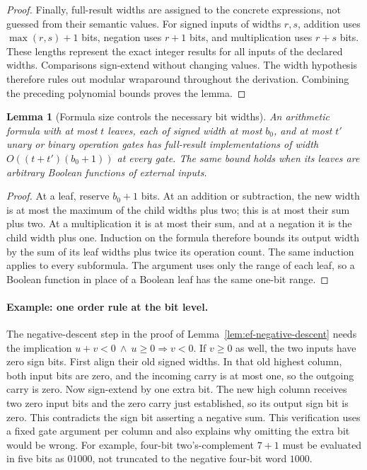 \documentclass[11pt]{article}
\newtheorem{lemma}[theorem]{Lemma}
\theoremstyle{definition}
\theoremstyle{remark}
\begin{document}
\begin{proof}
Finally, full-result widths are assigned to the concrete expressions,
not guessed from their semantic values. For signed inputs of widths
$r,s$, addition uses $\max(r,s)+1$ bits, negation uses $r+1$
bits, and multiplication uses $r+s$ bits. These lengths represent
the exact integer results for all inputs of the declared widths.
Comparisons sign-extend without changing values. The width hypothesis
therefore rules out modular wraparound throughout the derivation.
Combining the preceding polynomial bounds proves the lemma.
\end{proof}

\begin{lemma}[Formula size controls the necessary bit widths]
\label{lem:formula-integer-width}
An arithmetic formula with at most $t$ leaves, each of signed width
at most $b_0$, and at most $t'$ unary or binary operation gates has
full-result implementations of width $O((t+t')(b_0+1))$ at every
gate. The same bound holds when its leaves are arbitrary Boolean
functions of external inputs.
\end{lemma}
\begin{proof}
At a leaf, reserve $b_0+1$ bits. At an addition or subtraction,
the new width is at most the maximum of the child widths plus two;
this is at most their sum plus two. At a multiplication it is at
most their sum, and at a negation it is the child width plus one.
Induction on the formula therefore bounds its output width by the
sum of its leaf widths plus twice its operation count. The same
induction applies to every subformula. The argument uses only the
range of each leaf, so a Boolean function in place of a Boolean
leaf has the same one-bit range.
\end{proof}

\paragraph{Example: one order rule at the bit level.}
The negative-descent step in the proof of
Lemma~\ref{lem:ef-negative-descent} needs the implication
$u+v<0\ \wedge\ u\ge0\Rightarrow v<0$. If $v\ge0$ as well,
the two inputs have zero sign bits. First align their old signed
widths. In that old highest column, both input bits are zero, and
the incoming carry is at most one, so the outgoing carry is zero.
Now sign-extend by one extra bit. The new high column receives
two zero input bits and the zero carry just established, so its
output sign bit is zero. This contradicts the sign bit asserting a
negative sum. This verification uses a fixed gate argument per
column and also explains why omitting the extra bit would be wrong.
For example, four-bit two's-complement $7+1$ must be evaluated in
five bits as $01000$, not truncated to the negative four-bit word
$1000$.
\end{document}
